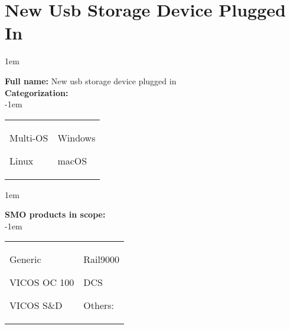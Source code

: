 
%
%

\section{New Usb Storage Device Plugged In}
\label{15031}

\openup 1em

\textbf{Full name:} New usb storage device plugged in\hrulefill \\
{\bf Categorization:} \\

\openup -1em
\vspace{-3em}

\begin{tabular}{p{}p{}}

\begin{todolist}
  	\item Multi-OS
	\item Linux
\end{todolist}
&
\begin{todolist}
	\item[\done] Windows
	\item macOS
\end{todolist}

\end{tabular}

\openup 1em

{\bf SMO products in scope:} \\

\openup -1em
\vspace{-3em}

\begin{tabular}{p{}p{}}

\begin{todolist}
  \item[\done] Generic
  \item[\done] VICOS OC 100
  \item[\done] VICOS S\&D
\end{todolist}
&
\begin{todolist}
  \item Rail9000
  \item DCS
  \item Others: \hrulefill
\end{todolist}

\end{tabular}

